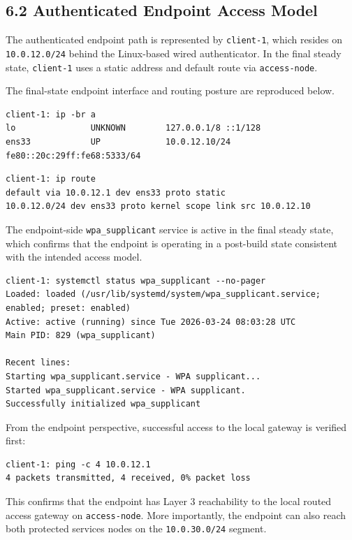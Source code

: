 \documentclass[11pt]{article}
\begin{document}
\subsection{6.2 Authenticated Endpoint Access Model}
\label{sec:authenticated-endpoint-access-model}

The authenticated endpoint path is represented by \texttt{client-1}, which resides on \texttt{10.0.12.0/24} behind the Linux-based wired authenticator. In the final steady state, \texttt{client-1} uses a static address and default route via \texttt{access-node}.

The final-state endpoint interface and routing posture are reproduced below.

\begin{verbatim}
client-1: ip -br a
lo               UNKNOWN        127.0.0.1/8 ::1/128
ens33            UP             10.0.12.10/24 fe80::20c:29ff:fe68:5333/64
\end{verbatim}

\begin{verbatim}
client-1: ip route
default via 10.0.12.1 dev ens33 proto static
10.0.12.0/24 dev ens33 proto kernel scope link src 10.0.12.10
\end{verbatim}

The endpoint-side \texttt{wpa\_supplicant} service is active in the final steady state, which confirms that the endpoint is operating in a post-build state consistent with the intended access model.

\begin{verbatim}
client-1: systemctl status wpa_supplicant --no-pager
Loaded: loaded (/usr/lib/systemd/system/wpa_supplicant.service; enabled; preset: enabled)
Active: active (running) since Tue 2026-03-24 08:03:28 UTC
Main PID: 829 (wpa_supplicant)

Recent lines:
Starting wpa_supplicant.service - WPA supplicant...
Started wpa_supplicant.service - WPA supplicant.
Successfully initialized wpa_supplicant
\end{verbatim}

From the endpoint perspective, successful access to the local gateway is verified first:

\begin{verbatim}
client-1: ping -c 4 10.0.12.1
4 packets transmitted, 4 received, 0% packet loss
\end{verbatim}

This confirms that the endpoint has Layer 3 reachability to the local routed access gateway on \texttt{access-node}. More importantly, the endpoint can also reach both protected services nodes on the \texttt{10.0.30.0/24} segment.
\end{document}
